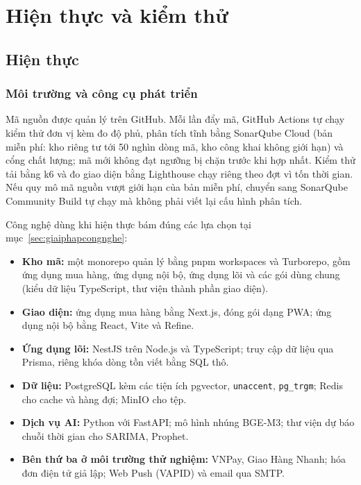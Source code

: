 \chapter{Hiện thực và kiểm thử}
\label{chap:hienthuc}


\section{Hiện thực}
\label{sec:hienthuc}


\subsection{Môi trường và công cụ phát triển}
\label{sec:moitruong}
Mã nguồn được quản lý trên GitHub. Mỗi lần đẩy mã, GitHub Actions tự chạy kiểm thử đơn vị kèm đo độ phủ, phân tích tĩnh bằng SonarQube Cloud (bản miễn phí: kho riêng tư tới 50 nghìn dòng mã, kho công khai không giới hạn) và cổng chất lượng; mã mới không đạt ngưỡng bị chặn trước khi hợp nhất. Kiểm thử tải bằng k6 và đo giao diện bằng Lighthouse chạy riêng theo đợt vì tốn thời gian. Nếu quy mô mã nguồn vượt giới hạn của bản miễn phí, chuyển sang SonarQube Community Build tự chạy mà không phải viết lại cấu hình phân tích.

Công nghệ dùng khi hiện thực bám đúng các lựa chọn tại mục~\ref{sec:giaiphapcongnghe}:
\begin{itemize}
    \item \textbf{Kho mã:} một monorepo quản lý bằng pnpm workspaces và Turborepo, gồm ứng dụng mua hàng, ứng dụng nội bộ, ứng dụng lõi và các gói dùng chung (kiểu dữ liệu TypeScript, thư viện thành phần giao diện).
    \item \textbf{Giao diện:} ứng dụng mua hàng bằng Next.js, đóng gói dạng PWA; ứng dụng nội bộ bằng React, Vite và Refine.
    \item \textbf{Ứng dụng lõi:} NestJS trên Node.js và TypeScript; truy cập dữ liệu qua Prisma, riêng khóa dòng tồn viết bằng SQL thô.
    \item \textbf{Dữ liệu:} PostgreSQL kèm các tiện ích pgvector, \texttt{unaccent}, \texttt{pg\_trgm}; Redis cho cache và hàng đợi; MinIO cho tệp.
    \item \textbf{Dịch vụ AI:} Python với FastAPI; mô hình nhúng BGE-M3; thư viện dự báo chuỗi thời gian cho SARIMA, Prophet.
    \item \textbf{Bên thứ ba ở môi trường thử nghiệm:} VNPay, Giao Hàng Nhanh; hóa đơn điện tử giả lập; Web Push (VAPID) và email qua SMTP.
\end{itemize}

